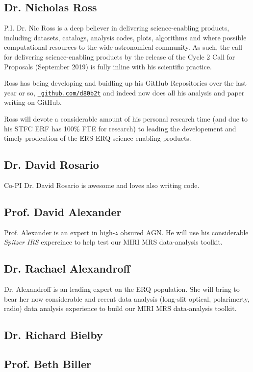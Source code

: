 
\subsection{Dr. Nicholas Ross}
P.I. Dr. Nic Ross is a deep believer in delivering science-enabling
products, including datasets, catalogs, analysis codes, plots,
algorithms and where possible computational resources to the wide
astronomical community.  As such, the call for delivering
science-enabling products by the release of the Cycle 2 Call for
Proposals (September 2019) is fully inline with his scientific
practice.

Ross has being developing and buidling up his GitHub Repositories over
the last year or so, \href{https://github.com/d80b2t}{\tt
github.com/d80b2t} and indeed now does all his analysis and paper
writing on GitHub.

Ross will devote a considerable amount of his personal research time
(and due to his STFC ERF has 100\% FTE for research) to leading the
developement and timely prodcution of the ERS ERQ science-enabling
products.


\subsection{Dr. David Rosario} 
Co-PI Dr. David Rosario is awesome and loves also writing code. 


\subsection{Prof. David Alexander} 
Prof. Alexander is an expert in high-$z$ obsured AGN.  He will use his
considerable {\it Spitzer IRS} expereince to help test our MIRI MRS
data-analysis toolkit.


\subsection{Dr. Rachael Alexandroff} 
Dr. Alexandroff is an leading expert on the ERQ population. 
She will bring to bear her now considerable and recent data analysis 
(long-slit optical, polarimerty, radio) data analysis experience to 
build our MIRI MRS data-analysis toolkit.


\subsection{Dr. Richard Bielby}


\subsection{Prof. Beth Biller}


